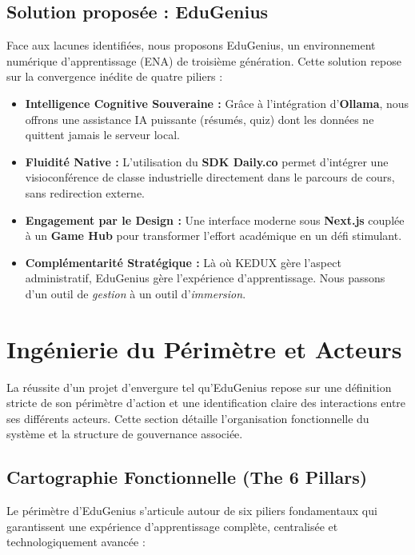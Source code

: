 \subsection{Solution proposée : EduGenius}
Face aux lacunes identifiées, nous proposons EduGenius, un environnement numérique d'apprentissage (ENA) de troisième génération. Cette solution repose sur la convergence inédite de quatre piliers :

\begin{itemize}
\item \textbf{Intelligence Cognitive Souveraine :} Grâce à l'intégration d'\textbf{Ollama}, nous offrons une assistance IA puissante (résumés, quiz) dont les données ne quittent jamais le serveur local.
\item \textbf{Fluidité Native :} L'utilisation du \textbf{SDK Daily.co} permet d'intégrer une visioconférence de classe industrielle directement dans le parcours de cours, sans redirection externe.
\item \textbf{Engagement par le Design :} Une interface moderne sous \textbf{Next.js} couplée à un \textbf{Game Hub} pour transformer l'effort académique en un défi stimulant.
\item \textbf{Complémentarité Stratégique :} Là où KEDUX gère l'aspect administratif, EduGenius gère l'expérience d'apprentissage. Nous passons d'un outil de \textit{gestion} à un outil d'\textit{immersion}.
\end{itemize}

\section{Ingénierie du Périmètre et Acteurs}

La réussite d'un projet d'envergure tel qu'EduGenius repose sur une définition stricte de son périmètre d'action et une identification claire des interactions entre ses différents acteurs. Cette section détaille l'organisation fonctionnelle du système et la structure de gouvernance associée.

\subsection{Cartographie Fonctionnelle (The 6 Pillars)}

Le périmètre d'EduGenius s'articule autour de six piliers fondamentaux qui garantissent une expérience d'apprentissage complète, centralisée et technologiquement avancée :

